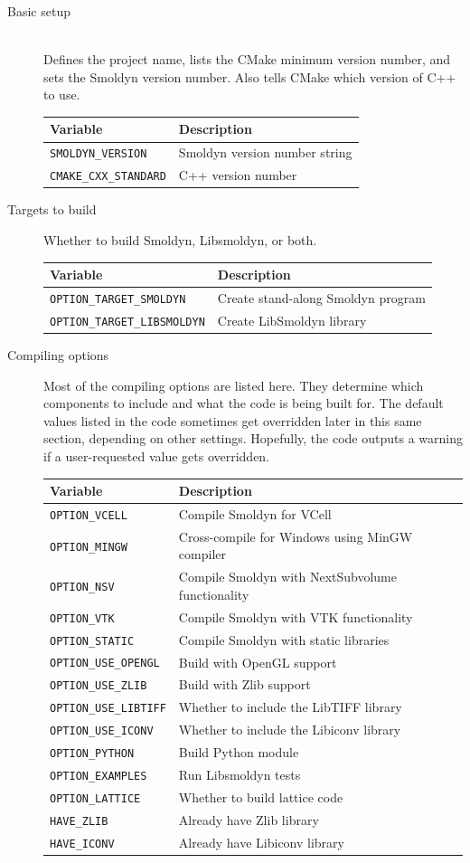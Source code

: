 \documentclass {scrbook}
\newcommand {\ttt} {\texttt}
\begin{document}
\begin{description}

\item[Basic setup]
\hfill \\
Defines the project name, lists the CMake minimum version number, and sets the Smoldyn version number. Also tells CMake which version of C++ to use.\\
\begin{longtable}[c]{ll}
Variable & Description\\
\hline
\ttt{SMOLDYN\_VERSION} & Smoldyn version number string\\
\ttt{CMAKE\_CXX\_STANDARD} & C++ version number\\
\end{longtable}

\item[Targets to build]
Whether to build Smoldyn, Libsmoldyn, or both.
\begin{longtable}[c]{ll}
Variable & Description\\
\hline
\ttt{OPTION\_TARGET\_SMOLDYN} & Create stand-along Smoldyn program\\
\ttt{OPTION\_TARGET\_LIBSMOLDYN} & Create LibSmoldyn library\\
\end{longtable}

\item[Compiling options]
Most of the compiling options are listed here. They determine which components to include and what the code is being built for. The default values listed in the code sometimes get overridden later in this same section, depending on other settings. Hopefully, the code outputs a warning if a user-requested value gets overridden.
\begin{longtable}[c]{ll}
Variable & Description\\
\hline
\ttt{OPTION\_VCELL} & Compile Smoldyn for VCell\\
\ttt{OPTION\_MINGW} & Cross-compile for Windows using MinGW compiler\\
\ttt{OPTION\_NSV} & Compile Smoldyn with NextSubvolume functionality\\
\ttt{OPTION\_VTK} & Compile Smoldyn with VTK functionality\\
\ttt{OPTION\_STATIC} & Compile Smoldyn with static libraries\\
\ttt{OPTION\_USE\_OPENGL} & Build with OpenGL support\\
\ttt{OPTION\_USE\_ZLIB} & Build with Zlib support\\
\ttt{OPTION\_USE\_LIBTIFF} & Whether to include the LibTIFF library\\
\ttt{OPTION\_USE\_ICONV} & Whether to include the Libiconv library\\
\ttt{OPTION\_PYTHON}  & Build Python module\\
\ttt{OPTION\_EXAMPLES} & Run Libsmoldyn tests\\
\ttt{OPTION\_LATTICE} & Whether to build lattice code\\
\ttt{HAVE\_ZLIB} & Already have Zlib library\\
\ttt{HAVE\_ICONV} & Already have Libiconv library\\
\end{longtable}


\end{description}
\end{document}
